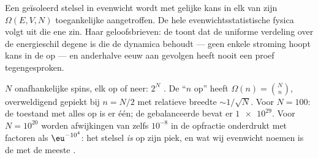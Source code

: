 \begin{theorem}\label{thm:b3:microcanonical-ensemble:postulate}
Een geïsoleerd stelsel in evenwicht wordt met gelijke kans in elk van zijn
$\Omega(E, V, N)$ toegankelijke  aangetroffen. De hele
evenwichtsstatistische fysica volgt uit die ene zin. Haar
geloofsbrieven: de  toont dat de uniforme verdeling
over de energieschil degene is die de dynamica behoudt --- geen enkele
stroming hoopt kans in de  op --- en anderhalve eeuw aan gevolgen
heeft nooit een proef tegengesproken.
\end{theorem}
\admitted

\begin{example}\label{ex:b3:microcanonical-ensemble:spins}
$N$ onafhankelijke spins, elk op of neer: $2^N$ . De
 ``$n$ op'' heeft  $\Omega(n) = \binom Nn$,
overweldigend gepiekt bij $n = N/2$ met relatieve breedte $\sim1/\sqrt N$.
Voor $N = 100$: de toestand met alles op is er één; de gebalanceerde
 bevat er $\num{1e29}$. Voor $N = 10^{20}$ worden afwijkingen
van zelfs $10^{-8}$ in de opfractie onderdrukt met factoren als
$\eu^{-10^4}$: het stelsel \emph{is} op zijn piek, en wat wij evenwicht
noemen is de  met de meeste .
\end{example}

